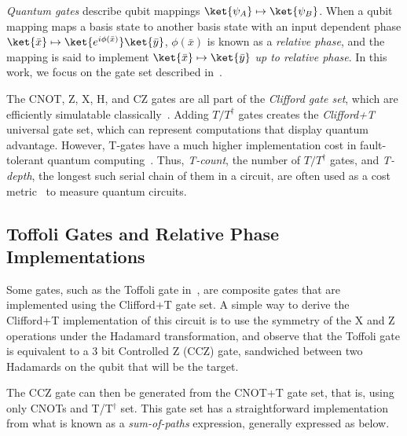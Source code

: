 
{\it Quantum gates} describe qubit mappings $\ket{{\psi}_A} \mapsto \ket{{\psi}_B}$. When a qubit mapping maps
a basis state to another basis state with an input dependent phase
$\ket{\bar{x}} \mapsto \ket{e^{i\phi(\bar{x})}}\ket{\bar{y}}$, $\phi(\bar{x})$ is known as a \emph{relative phase},
and the mapping is said to implement $\ket{\bar{x}} \mapsto \ket{\bar{y}}$ \emph{up to relative phase}. In this
work, we focus on the gate set described in~.

The CNOT, Z, X, H, and CZ gates are all part of the \emph{Clifford gate set}, which are efficiently simulatable
classically~\cite{bib-gottesman-knill}. Adding $T/T^{\dagger}$ gates creates the \emph{Clifford+T} universal gate
set, which can represent computations that display quantum advantage. However, T-gates have a much higher
implementation cost in fault-tolerant quantum computing~\cite{bib-gottesman-stabilizer}. Thus, {\it T-count}, the
number of $T/T^{\dagger}$ gates, and {\it T-depth}, the longest such serial chain of them in a circuit, are often
used as a cost metric~\cite{amy-meet-in-middle} to measure quantum circuits.

\subsection{Toffoli Gates and Relative Phase Implementations}
\label{sub-toff}

Some gates, such as the Toffoli gate in~, are composite gates that are implemented using the
Clifford+T gate set. A simple way to derive the Clifford+T implementation of this circuit is to use the symmetry
of the X and Z operations under the Hadamard transformation, and observe that the Toffoli gate is equivalent to
a 3 bit Controlled Z (CCZ) gate, sandwiched between two Hadamards on the qubit that will be the target.

The CCZ gate can then be generated from the CNOT+T gate set, that is, using only CNOTs and T/T$^{\dagger}$ set.
This gate set has a straightforward implementation from what is known as a \emph{sum-of-paths} expression,
generally expressed as below.

